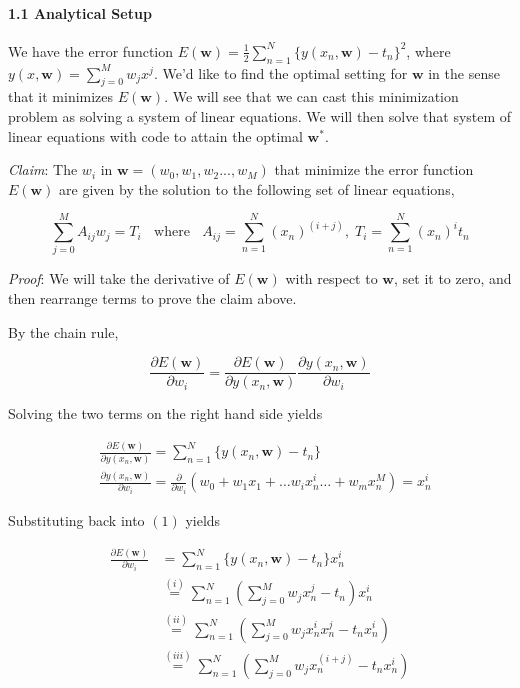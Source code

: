 \documentclass[
  0.875em,
  letterpaper,
  DIV=11,
  numbers=noendperiod]{scrartcl}
\let\oldparagraph\paragraph
\renewcommand{\paragraph}[1]{\oldparagraph{#1}\mbox{}}
\begin{document}
\hypertarget{analytical-setup}{%
\paragraph{\texorpdfstring{\textbf{1.1 Analytical
Setup}}{1.1 Analytical Setup}}\label{analytical-setup}}

We have the error function
\(E(\mathbf{w}) = \frac{1}{2} \sum_{n=1}^N \{y(x_n, \mathbf{w}) - t_n \}^2\),
where \(y(x, \mathbf{w}) = \sum_{j=0}^M w_j x^j\). We'd like to find the
optimal setting for \(\mathbf{w}\) in the sense that it minimizes
\(E(\mathbf{w})\). We will see that we can cast this minimization
problem as solving a system of linear equations. We will then solve that
system of linear equations with code to attain the optimal
\(\mathbf{w}^{*}\).

\emph{Claim}: The \(w_i\) in \(\mathbf{w} = (w_0, w_1, w_2 ..., w_M)\)
that minimize the error function \(E(\mathbf{w})\) are given by the
solution to the following set of linear equations,

\[
\sum_{j=0}^M A_{ij}w_j = T_i \;\; \text{ where } \;\; A_{ij} = \sum_{n=1}^N(x_n)^{(i+j)}, \; T_i = \sum_{n=1}^N (x_n)^i t_n
\]

\emph{Proof}: We will take the derivative of \(E(\mathbf{w})\) with
respect to \(\mathbf{w}\), set it to zero, and then rearrange terms to
prove the claim above.

By the chain rule,

\[
\frac{\partial E(\mathbf{w})}{\partial w_i} = \frac{\partial E(\mathbf{w})}{\partial y(x_n, \mathbf{w})} \frac{\partial y(x_n, \mathbf{w})}{\partial w_i} \tag{1}
\]

Solving the two terms on the right hand side yields

\[
\begin{aligned}
&\frac{\partial E(\mathbf{w})}{\partial y(x_n, \mathbf{w})} = \sum_{n=1}^N \{y(x_n, \mathbf{w}) - t_n \} \\
&\frac{\partial y(x_n, \mathbf{w})}{\partial w_i} = \frac{\partial}{\partial w_i} (w_0 + w_1x_1 + \dots w_i x_n^i \dots + w_m x_n^M) = x_n^i 
\end{aligned}
\]

Substituting back into \((1)\) yields

\[
\begin{aligned}
\frac{\partial E(\mathbf{w})}{\partial w_i} & = \sum_{n=1}^N \{y(x_n, \mathbf{w}) - t_n \} x_n^i \\ 
& \overset{(i)}{=} \sum_{n=1}^N (\sum_{j=0}^M w_j x_n^{j} - t_n)x_n^i \\
& \overset{(ii)}{=} \sum_{n=1}^N (\sum_{j=0}^M w_j x_n^{i}x_n^j - t_n x_n^i) \\
& \overset{(iii)}{=} \sum_{n=1}^N (\sum_{j=0}^M w_j x_n^{(i+j)} - t_n x_n^i)
\end{aligned}
\]
\end{document}
